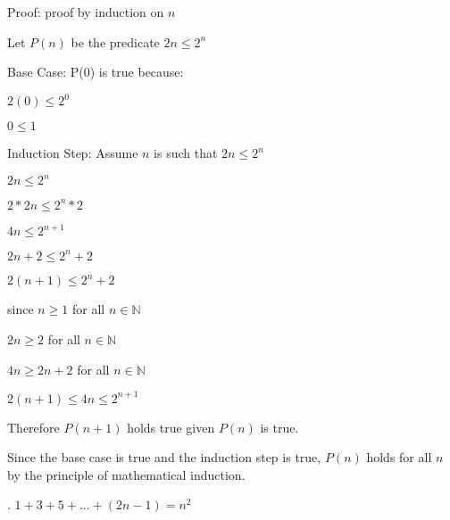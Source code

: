 \documentclass[12pt]{article}[12pt]
\begin{document}
\begin{addmargin}[1em]{2em}

Proof: proof by induction on $n$

Let $P(n)$ be the predicate $2n\leq 2^n$

Base Case: P(0) is true because:

$2(0)\leq 2^0$

$0\leq 1$

Induction Step: Assume $n$ is such that $2n\leq 2^n$

$2n\leq 2^n$

$2 * 2n \leq 2^n*2$

$4n \leq 2^{n+1}$

$2n+2\leq 2^n+2$

$2(n+1)\leq 2^n+2$

since $n\geq 1$ for all $n\in \mathbb{N}$

$2n\geq 2$ for all $n\in \mathbb{N}$

$4n\geq 2n+2$ for all $n\in \mathbb{N}$

$2(n+1)\leq 4n \leq 2^{n+1}$

Therefore $P(n+1)$ holds true given $P(n)$ is true.

Since the base case is true and the induction step is true, $P(n)$ holds for all $n$ by the principle of mathematical induction.
\end{addmargin}
. $1+3+5+...+(2n-1)=n^2$
\end{document}
